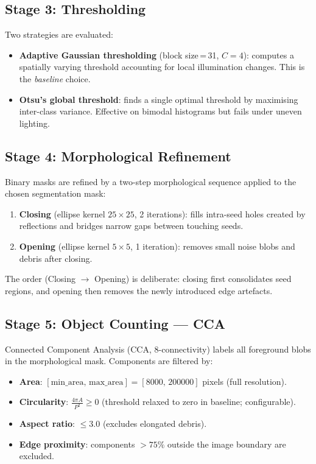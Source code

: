 \documentclass[12pt,a4paper]{article}
\begin{document}
\subsection{Stage 3: Thresholding}

Two strategies are evaluated:

\begin{itemize}
    \item \textbf{Adaptive Gaussian thresholding} (block size\,=\,31,
          $C = 4$): computes a spatially varying threshold accounting for
          local illumination changes. This is the \emph{baseline} choice.
    \item \textbf{Otsu's global threshold}: finds a single optimal threshold
          by maximising inter-class variance. Effective on bimodal histograms
          but fails under uneven lighting.
\end{itemize}

\subsection{Stage 4: Morphological Refinement}

Binary masks are refined by a two-step morphological sequence applied to the
chosen segmentation mask:

\begin{enumerate}
    \item \textbf{Closing} (ellipse kernel $25 \times 25$, 2 iterations):
          fills intra-seed holes created by reflections and bridges narrow
          gaps between touching seeds.
    \item \textbf{Opening} (ellipse kernel $5 \times 5$, 1 iteration):
          removes small noise blobs and debris after closing.
\end{enumerate}

The order (Closing $\rightarrow$ Opening) is deliberate: closing first
consolidates seed regions, and opening then removes the newly introduced edge
artefacts.

\subsection{Stage 5: Object Counting --- CCA}

Connected Component Analysis (CCA, 8-connectivity) labels all foreground
blobs in the morphological mask. Components are filtered by:

\begin{itemize}
    \item \textbf{Area}: $[\text{min\_area},\, \text{max\_area}] = [8000,\, 200000]$
          pixels (full resolution).
    \item \textbf{Circularity}: $\frac{4\pi A}{P^2} \geq 0$ (threshold
          relaxed to zero in baseline; configurable).
    \item \textbf{Aspect ratio}: $\leq 3.0$ (excludes elongated debris).
    \item \textbf{Edge proximity}: components $>75\%$ outside the image
          boundary are excluded.
\end{itemize}
\end{document}
